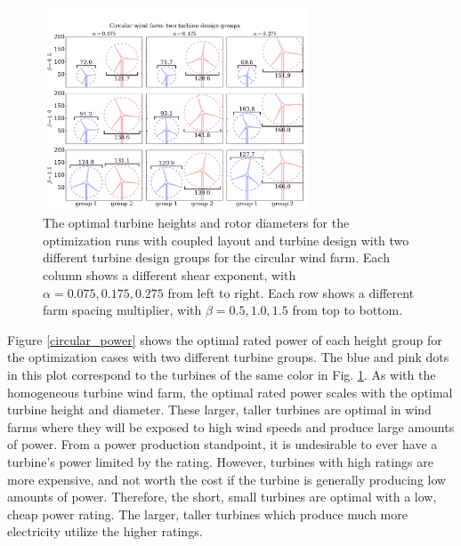 \documentclass[wes, manuscript]{copernicus}
\providecommand{\DIFaddbeginFL}{} %
\providecommand{\DIFaddendFL}{} %
\providecommand{\DIFdelbeginFL}{} %
\providecommand{\DIFdelendFL}{} %
\begin{document}
\begin{figure}[htbp]
  \centering
  \DIFdelbeginFL %
\DIFdelendFL \DIFaddbeginFL \includegraphics[trim={0.5cm 0.3cm 0.3cm 2.75cm},clip,width=0.7\textwidth]{Figures/turbineSizesCircular_2.pdf}
  \DIFaddendFL \caption{\label{circular_turbines} The optimal turbine heights and rotor diameters for the optimization runs with coupled layout and turbine design with two different turbine design groups for the circular wind farm. Each column shows a different shear exponent, with $\alpha=0.075,0.175,0.275$ from left to right. Each row shows a different farm spacing multiplier, with $\beta=0.5,1.0,1.5$ from top to bottom.}
\end{figure}


Figure \ref{circular_power} shows the optimal rated power of each height group for the optimization cases with two different turbine groups. The blue and pink dots in this plot correspond to the turbines of the same color in Fig. \ref{circular_turbines}. As with the homogeneous turbine wind farm, the optimal rated power scales with the optimal turbine height and diameter. These larger, taller turbines are optimal in wind farms where they will be exposed to high wind speeds and produce large amounts of power. From a power production standpoint, it is undesirable to ever have a turbine's power limited by the rating. However, turbines with high ratings are more expensive, and not worth the cost if the turbine is generally producing low amounts of power. Therefore, the short, small turbines are optimal with a low, cheap power rating. The larger, taller turbines which produce much more electricity utilize the higher ratings.
\end{document}
